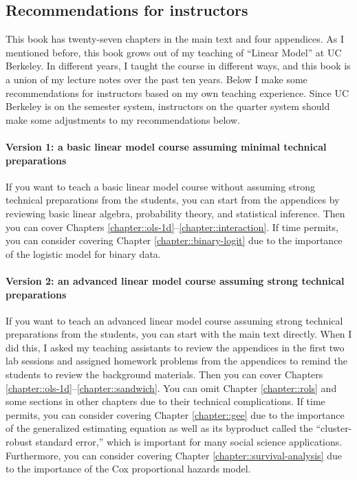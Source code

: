  
 
 


\subsection*{Recommendations for instructors}



This book has twenty-seven chapters in the main text and four appendices. As I mentioned before, this book grows out of my teaching of ``Linear Model'' at UC Berkeley. In different years, I taught the course in different ways, and this book is a union of my lecture notes over the past ten years. Below I make some recommendations for instructors based on my own teaching experience. Since UC Berkeley is on the semester system, instructors on the quarter system should make some adjustments to my recommendations below.



\paragraph*{Version 1: a basic linear model course assuming minimal technical preparations}
If you want to teach a basic linear model course without assuming strong technical preparations from the students, you can start from the appendices by reviewing basic linear algebra, probability theory, and statistical inference. Then you can cover Chapters \ref{chapter::ols-1d}--\ref{chapter::interaction}. If time permits, you can consider covering Chapter \ref{chapter::binary-logit} due to the importance of the logistic model for binary data. 


\paragraph*{Version 2: an advanced linear model course assuming strong technical preparations}
If you want to teach an advanced linear model course assuming strong technical preparations from the students, you can start with the main text directly. When I did this, I asked my teaching assistants to review the appendices in the first two lab sessions and assigned homework problems from the appendices to remind the students to review the background materials. Then you can cover Chapters \ref{chapter::ols-1d}--\ref{chapter::sandwich}. You can omit Chapter \ref{chapter::rols} and some sections in other chapters due to their technical complications. If time permits, you can consider covering Chapter \ref{chapter::gee} due to the importance of the generalized estimating equation as well as its byproduct called the ``cluster-robust standard error,'' which is important for many social science applications. 
Furthermore, you can consider covering Chapter \ref{chapter::survival-analysis} due to the importance of the Cox proportional hazards model. 



